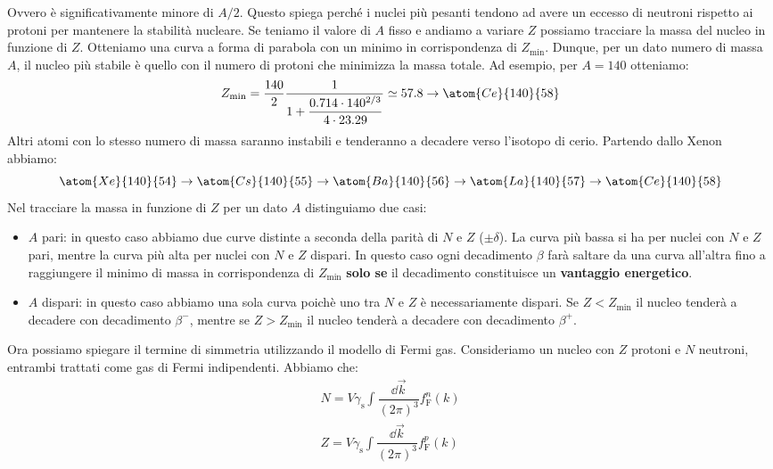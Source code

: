 Ovvero è significativamente minore di $A/2$. Questo spiega perché i nuclei più pesanti tendono ad avere un eccesso di neutroni rispetto ai protoni per mantenere la stabilità nucleare. Se teniamo il valore di $A$ fisso e andiamo a variare $Z$ possiamo tracciare la massa del nucleo in funzione di $Z$. Otteniamo una curva a forma di parabola con un minimo in corrispondenza di $Z_{\text{min}}$. Dunque, per un dato numero di massa $A$, il nucleo più stabile è quello con il numero di protoni che minimizza la massa totale. Ad esempio, per $A=140$ otteniamo:
\begin{equation}
  Z_{\text{min}} = \dfrac{140}{2} \dfrac{1}{1 + \dfrac{0.714 \cdot 140^{2/3}}{4 \cdot 23.29}} \simeq 57.8 \rightarrow \atom{Ce}{140}{58}
\end{equation}
Altri atomi con lo stesso numero di massa saranno instabili e tenderanno a decadere verso l'isotopo di cerio. Partendo dallo Xenon abbiamo:
\begin{equation}
  \atom{Xe}{140}{54} \to \atom{Cs}{140}{55} \to \atom{Ba}{140}{56} \to \atom{La}{140}{57} \to \atom{Ce}{140}{58}
\end{equation}
Nel tracciare la massa in funzione di $Z$ per un dato $A$ distinguiamo due casi:
\begin{itemize}
    \item $A$ pari: in questo caso abbiamo due curve distinte a seconda della parità di $N$ e $Z$ ($\pm\delta$). La curva più bassa si ha per nuclei con $N$ e $Z$ pari, mentre la curva più alta per nuclei con $N$ e $Z$ dispari. In questo caso ogni decadimento $\beta$ farà saltare da una curva all'altra fino a raggiungere il minimo di massa in corrispondenza di $Z_{\text{min}}$ \textbf{solo se} il decadimento constituisce un \textbf{vantaggio energetico}.
    \item $A$ dispari: in questo caso abbiamo una sola curva poichè uno tra $N$ e $Z$ è necessariamente dispari. Se $Z < Z_{\text{min}}$ il nucleo tenderà a decadere con decadimento $\beta^-$, mentre se $Z > Z_{\text{min}}$ il nucleo tenderà a decadere con decadimento $\beta^+$.
\end{itemize}
Ora possiamo spiegare il termine di simmetria utilizzando il modello di Fermi gas. Consideriamo un nucleo con $Z$ protoni e $N$ neutroni, entrambi trattati come gas di Fermi indipendenti. Abbiamo che:
\begin{equation}
    \begin{split}
        N = V\gamma_{\text{s}} \int \dfrac{\dd{\vec{k}}}{(2\pi)^3} f_{\text{F}}^n(k) \\[8pt]
        Z = V\gamma_{\text{s}} \int \dfrac{\dd{\vec{k}}}{(2\pi)^3} f_{\text{F}}^p(k)
    \end{split}
\end{equation}
